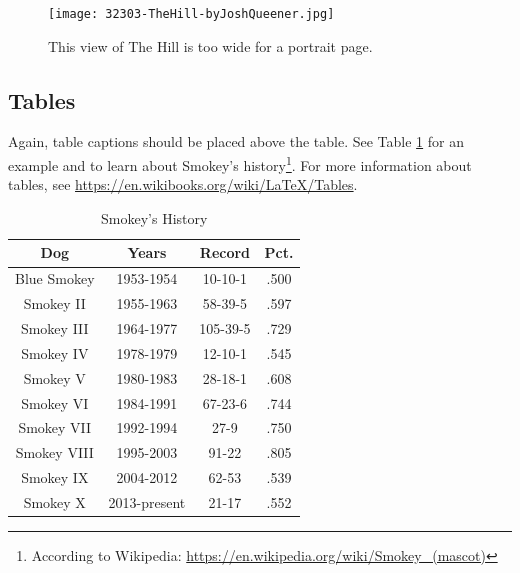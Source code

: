 \begin{landscape}
\thispagestyle{mylandscape}
	\begin{figure}[h]
		\centering
		\texttt{[image: 32303-TheHill-byJoshQueener.jpg]}
		\caption{This view of The Hill is too wide for a portrait page.}
		\label{fig:wide-pic}
	\end{figure}
\end{landscape}

\subsection{Tables}
Again, table captions should be placed above the table. See Table \ref{tab:table-a} for an example and to learn about Smokey's history\footnote{According to Wikipedia: \href{https://en.wikipedia.org/wiki/Smokey_(mascot)}{https://en.wikipedia.org/wiki/Smokey\_(mascot)}}. For more information about tables, see \href{https://en.wikibooks.org/wiki/LaTeX/Tables}{https://en.wikibooks.org/wiki/LaTeX/Tables}.

\begin{table}[hb]
\caption{Smokey's History}
\label{tab:table-a}
\begin{center}
\begin{tabular}[b]{|c|c|c|c|}
	\hline
	Dog & Years & Record & Pct. \\ \hline
	Blue Smokey & 1953-1954 & 10-10-1 & .500 \\ \hline
	Smokey II & 1955-1963 & 58-39-5 & .597 \\ \hline
	Smokey III & 1964-1977 & 105-39-5 & .729 \\ \hline
	Smokey IV & 1978-1979 & 12-10-1 & .545 \\ \hline
	Smokey V & 1980-1983 & 28-18-1 & .608 \\ \hline
	Smokey VI & 1984-1991 & 67-23-6 & .744 \\ \hline
	Smokey VII & 1992-1994 & 27-9 & .750 \\ \hline
	Smokey VIII & 1995-2003 & 91-22 & .805 \\ \hline
	Smokey IX & 2004-2012 & 62-53 & .539 \\ \hline
	Smokey X & 2013-present & 21-17 & .552 \\ \hline
\end{tabular}
\end{center}
\end{table}


